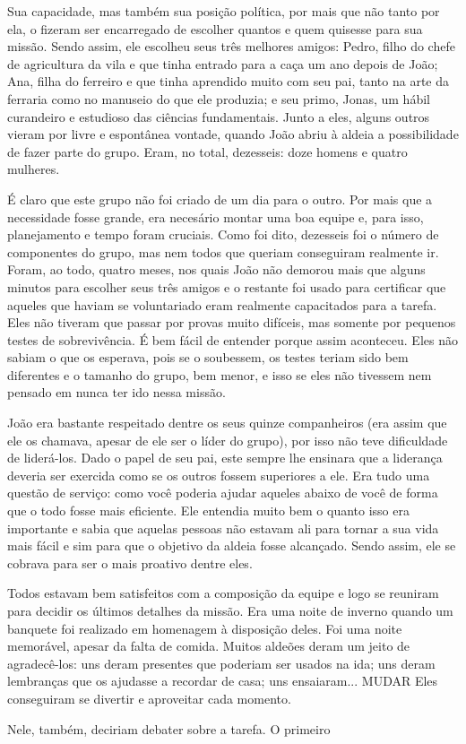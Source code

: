 Sua capacidade, mas também sua posição política, por mais que não tanto por ela, o fizeram ser encarregado de escolher quantos e quem quisesse para sua missão. Sendo assim, ele escolheu seus três melhores amigos: Pedro, filho do chefe de agricultura da vila e que tinha entrado para a caça um ano depois de João; Ana, filha do ferreiro e que tinha aprendido muito com seu pai, tanto na arte da ferraria como no manuseio do que ele produzia; e seu primo, Jonas, um hábil curandeiro e estudioso das ciências fundamentais. Junto a eles, alguns outros vieram por livre e espontânea vontade, quando João abriu à aldeia a possibilidade de fazer parte do grupo. Eram, no total, dezesseis: doze homens e quatro mulheres.

É claro que este grupo não foi criado de um dia para o outro. Por mais que a necessidade fosse grande, era necesário montar uma boa equipe e, para isso, planejamento e tempo foram cruciais. Como foi dito, dezesseis foi o número de componentes do grupo, mas nem todos que queriam conseguiram realmente ir. Foram, ao todo, quatro meses, nos quais João não demorou mais que alguns minutos para escolher seus três amigos e o restante foi usado para certificar que aqueles que haviam se voluntariado eram realmente capacitados para a tarefa. Eles não tiveram que passar por provas muito difíceis, mas somente por pequenos testes de sobrevivência. É bem fácil de entender porque assim aconteceu. Eles não sabiam o que os esperava, pois se o soubessem, os testes teriam sido bem diferentes e o tamanho do grupo, bem menor, e isso se eles não tivessem nem pensado em nunca ter ido nessa missão.

João era bastante respeitado dentre os seus quinze companheiros (era assim que ele os chamava, apesar de ele ser o líder do grupo), por isso não teve dificuldade de liderá-los. Dado o papel de seu pai, este sempre lhe ensinara que a liderança deveria ser exercida como se os outros fossem superiores a ele. Era tudo uma questão de serviço: como você poderia ajudar aqueles abaixo de você de forma que o todo fosse mais eficiente. Ele entendia muito bem o quanto isso era importante e sabia que aquelas pessoas não estavam ali para tornar a sua vida mais fácil e sim para que o objetivo da aldeia fosse alcançado. Sendo assim, ele se cobrava para ser o mais proativo dentre eles.

Todos estavam bem satisfeitos com a composição da equipe e logo se reuniram para decidir os últimos detalhes da missão. Era uma noite de inverno quando um banquete foi realizado em homenagem à disposição deles. Foi uma noite memorável, apesar da falta de comida. Muitos aldeões deram um jeito de agradecê-los: uns deram presentes que poderiam ser usados na ida; uns deram lembranças que os ajudasse a recordar de casa; uns ensaiaram... MUDAR Eles conseguiram se divertir e aproveitar cada momento. 

Nele, também, deciriam debater sobre a tarefa. O primeiro
